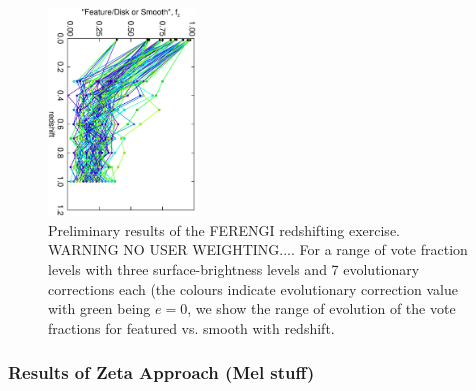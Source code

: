 \documentclass[usenatbib]{mn2e}
\begin{document}
\begin{figure}
\begin{center}

\includegraphics[width=0.35\textwidth,angle=90]{somewhat_fake_results.ps}

\caption{Preliminary results of the FERENGI redshifting exercise. WARNING NO USER WEIGHTING.... For a range of vote fraction levels with three surface-brightness levels and 7 evolutionary corrections each (the colours indicate evolutionary correction value with green being $e=0$, we show the range of evolution of the vote fractions for featured vs. smooth with redshift.}

\label{fig:ferengi_results_fake}

\end{center}
\end{figure}
\subsubsection{Results of Zeta Approach (Mel stuff)}
\end{document}

